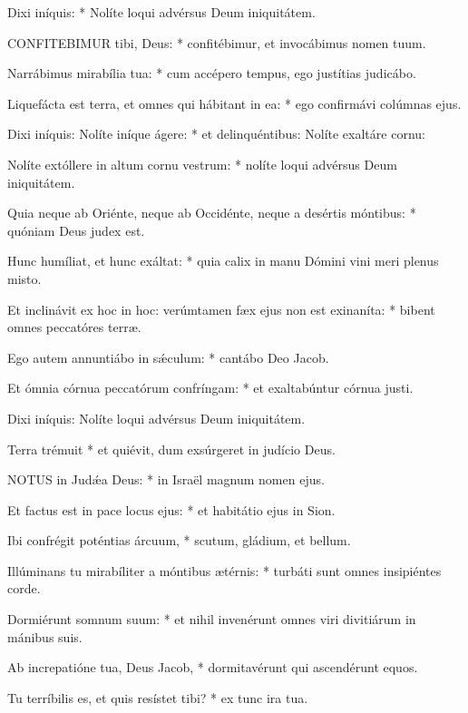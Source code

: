 
 Dixi iníquis: * Nolíte loqui advérsus Deum iniquitátem.


\lettrine[lines=2]{C}{ONFITEBIMUR} tibi, Deus: * confitébimur, et invocábimus nomen tuum.

Narrábimus mirabília tua: * cum accépero tempus, ego justítias judicábo.

Liquefácta est terra, et omnes qui hábitant in ea: * ego confirmávi colúmnas ejus.

Dixi iníquis: Nolíte iníque ágere: * et delinquéntibus: Nolíte exaltáre cornu:

Nolíte extóllere in altum cornu vestrum: * nolíte loqui advérsus Deum iniquitátem.

Quia neque ab Oriénte, neque ab Occidénte, neque a desértis móntibus: * quóniam Deus judex est.

Hunc humíliat, et hunc exáltat: * quia calix in manu Dómini vini meri plenus misto.

Et inclinávit ex hoc in hoc: verúmtamen fæx ejus non est exinaníta: * bibent omnes peccatóres terræ.

Ego autem annuntiábo in sǽculum: * cantábo Deo Jacob.

Et ómnia córnua peccatórum confríngam: * et exaltabúntur córnua justi.

\rubric{\textdagger}

 Dixi iníquis: Nolíte loqui advérsus Deum iniquitátem.

 Terra trémuit * et quiévit, dum exsúrgeret in judício Deus.


\lettrine[lines=2]{N}{OTUS} in Judǽa Deus: * in Israël magnum nomen ejus.

Et factus est in pace locus ejus: * et habitátio ejus in Sion.

Ibi confrégit poténtias árcuum, * scutum, gládium, et bellum.

Illúminans tu mirabíliter a móntibus ætérnis: * turbáti sunt omnes insipiéntes corde.

Dormiérunt somnum suum: * et nihil invenérunt omnes viri divitiárum in mánibus suis.

Ab increpatióne tua, Deus Jacob, * dormitavérunt qui ascendérunt equos.

Tu terríbilis es, et quis resístet tibi? * ex tunc ira tua.

